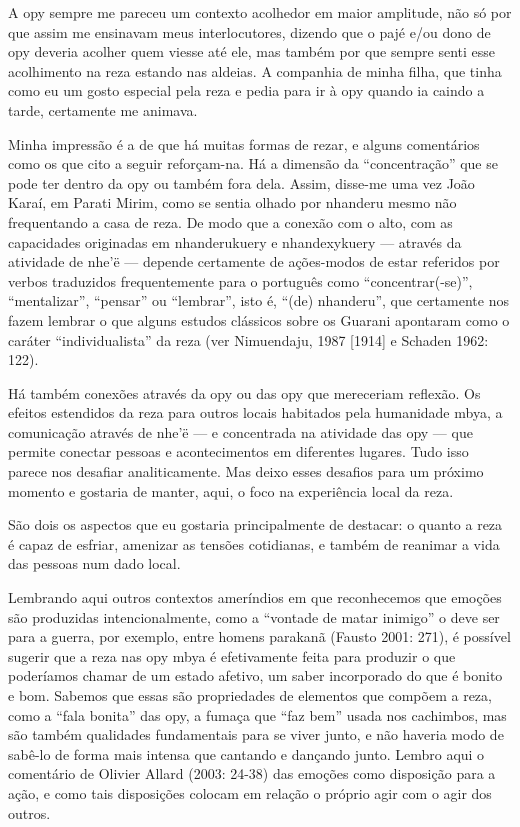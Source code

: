 A opy sempre me pareceu um contexto acolhedor em maior amplitude, não só
por que assim me ensinavam meus interlocutores, dizendo que o pajé e/ou
dono de opy deveria acolher quem viesse até ele, mas também por que
sempre senti esse acolhimento na reza estando nas aldeias. A companhia
de minha filha, que tinha como eu um gosto especial pela reza e pedia
para ir à opy quando ia caindo a tarde, certamente me animava.

Minha impressão é a de que há muitas formas de rezar, e alguns
comentários como os que cito a seguir reforçam-na. Há a dimensão da
``concentração'' que se pode ter dentro da opy ou também fora dela.
Assim, disse-me uma vez João Karaí, em Parati Mirim, como se sentia
olhado por nhanderu mesmo não frequentando a casa de reza. De modo que
a conexão com o alto, com as capacidades originadas em nhanderukuery e
nhandexykuery — através da atividade de nhe’ë — depende certamente de
ações-modos de estar referidos por verbos traduzidos frequentemente
para o português como ``concentrar(-se)'',  ``mentalizar'', ``pensar'' ou
``lembrar'', isto é, ``(de) nhanderu'', que certamente nos fazem lembrar o
que alguns estudos clássicos sobre os Guarani apontaram como o caráter
``individualista'' da reza (ver Nimuendaju, 1987 [1914] e Schaden 1962:
122). 

Há também conexões através da opy ou das opy que mereceriam reflexão. Os
efeitos estendidos da reza para outros locais habitados pela humanidade
mbya, a comunicação através de nhe’ë — e concentrada na atividade das
opy — que permite conectar pessoas e acontecimentos em diferentes
lugares. Tudo isso parece nos desafiar analiticamente. Mas deixo esses
desafios para um próximo momento e gostaria de manter, aqui, o foco na
experiência local da reza.

São dois os aspectos que eu gostaria principalmente de destacar: o
quanto a reza é capaz de esfriar, amenizar as tensões cotidianas, e
também de reanimar a vida das pessoas num dado local.

Lembrando aqui outros contextos ameríndios em que reconhecemos que
emoções são produzidas intencionalmente, como a ``vontade de matar
inimigo'' o deve ser para a guerra, por exemplo, entre homens parakanã
(Fausto 2001: 271), é possível sugerir que a reza nas opy mbya é
efetivamente feita para produzir o que poderíamos chamar de um estado
afetivo, um saber incorporado do que é bonito e bom. Sabemos que essas
são propriedades de elementos que compõem a reza, como a ``fala bonita''
das opy, a fumaça que ``faz bem'' usada nos cachimbos, mas são também
qualidades fundamentais para se viver junto, e não haveria modo de
sabê-lo de forma mais intensa que cantando e dançando junto. Lembro
aqui o comentário de Olivier Allard (2003: 24-38) das emoções como
disposição para a ação, e como tais disposições colocam em relação o
próprio agir com o agir dos outros.

